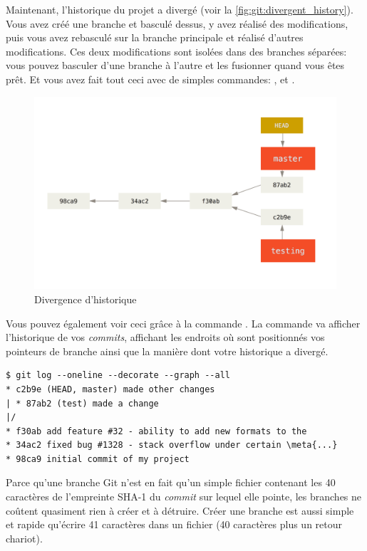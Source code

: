 Maintenant, l'historique du projet a divergé (voir la \autoref{fig:git:divergent_history}).
Vous avez créé une branche et basculé dessus, y avez réalisé des modifications, puis vous avez rebasculé sur la branche principale et réalisé d'autres modifications.
Ces deux modifications sont isolées dans des branches séparées: vous pouvez basculer d'une branche à l'autre et les fusionner quand vous êtes prêt.
Et vous avez fait tout ceci avec de simples commandes: ,  et .

\begin{figure}[!h]
  \centering
  \includegraphics{images/advance-master}
  \caption{Divergence d'historique}
  \label{fig:git:divergent_history}
\end{figure}

Vous pouvez également voir ceci grâce à la commande .
La commande  va afficher l'historique de vos \emph{commits}, affichant les endroits où sont positionnés vos pointeurs de branche ainsi que la manière dont votre historique a divergé.
\begin{Schunk}
\begin{Verbatim}[commandchars=\\\{\}]
$ git log --oneline --decorate --graph --all
* c2b9e (HEAD, master) made other changes
| * 87ab2 (test) made a change
|/
* f30ab add feature #32 - ability to add new formats to the
* 34ac2 fixed bug #1328 - stack overflow under certain \meta{...}
* 98ca9 initial commit of my project
\end{Verbatim}
\end{Schunk}

Parce qu'une branche Git n'est en fait qu'un simple fichier contenant les 40 caractères de l'empreinte SHA-1 du \emph{commit} sur lequel elle pointe, les branches ne coûtent quasiment rien à créer et à détruire.
Créer une branche est aussi simple et rapide qu'écrire 41 caractères dans un fichier (40 caractères plus un retour chariot).

